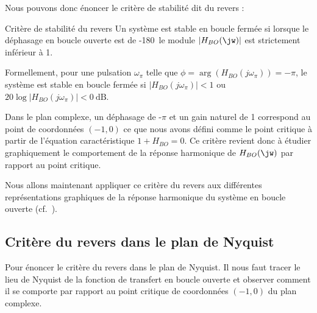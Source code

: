 Nous pouvons donc énoncer le critère de stabilité dit du revers :
\begin{criteria}{Critère de stabilité du revers}
    Un système est stable en boucle fermée si lorsque le 
    déphasage en boucle ouverte est de -180\degreeSI~le module $|H_{BO}(\jw)|$ 
    est strictement inférieur à 1.
\end{criteria}
Formellement, pour une pulsation $\omega_{\pi}$ telle que 
$\phi=\arg{\left(H_{BO}(j\omega_\pi)\right)}=-\pi$, 
le système est stable en boucle fermée si $|H_{BO}(j\omega_\pi)|<1$ ou 
$20\log{|H_{BO}(j\omega_\pi)|}<\SI{0}{\dB}$.

Dans le plan complexe, un  déphasage de -$\pi$ et un gain naturel de 1 
correspond au point de coordonnées $(-1,0)$ ce que nous avons défini comme 
le point critique à partir de l'équation caractéristique $1+H_{BO}=0$. 
Ce critère revient donc à étudier graphiquement le comportement 
de la réponse harmonique de $H_{BO}(\jw)$ par rapport au point critique.

Nous allons maintenant appliquer ce 
critère du revers aux différentes représentations graphiques de la 
réponse harmonique du système en boucle ouverte (cf.~).
\clearpage
\subsection{Critère du revers dans le plan de Nyquist
}
Pour énoncer le critère du revers dans le plan de Nyquist. Il nous faut tracer
le lieu de Nyquist de la fonction de transfert en boucle ouverte et observer 
comment il se comporte par rapport au point critique de coordonnées $(-1,0)$ 
du plan complexe. 

